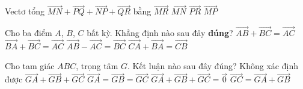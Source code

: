 \begin{ex}%
Vectơ tổng $\overrightarrow{M N}+\overrightarrow{P Q}+\overrightarrow{N P}+\overrightarrow{Q R}$ bằng
\choice
{\True $\overrightarrow{MR}$}
{$\overrightarrow{MN}$}
{$\overrightarrow{PR}$}
{$\overrightarrow{MP}$}
\end{ex}

\begin{ex}%
Cho ba điểm $A$, $B$, $C$ bất kỳ. Khẳng định nào sau đây \textbf{đúng}?
\choice
{\True $\overrightarrow{AB}+\overrightarrow{BC}=\overrightarrow{AC}$}
{$\overrightarrow{BA}+\overrightarrow{BC}=\overrightarrow{AC}$}
{$\overrightarrow{AB}-\overrightarrow{AC}=\overrightarrow{BC}$}
{$\overrightarrow{CA}+\overrightarrow{BA}=\overrightarrow{CB}$}
\end{ex}

\begin{ex}%
Cho tam giác $ABC$, trọng tâm $G$. Kết luận nào sau đây đúng?
\choice
{Không xác định được $\overrightarrow{GA}+\overrightarrow{GB}+\overrightarrow{GC}$}
{$\overrightarrow{GA}=\overrightarrow{GB}=\overrightarrow{GC}$}
{\True $\overrightarrow{GA}+\overrightarrow{GB}+\overrightarrow{GC}=\overrightarrow{0}$}
{$\overrightarrow{GC}=\overrightarrow{GA}+\overrightarrow{GB}$}
\end{ex}


